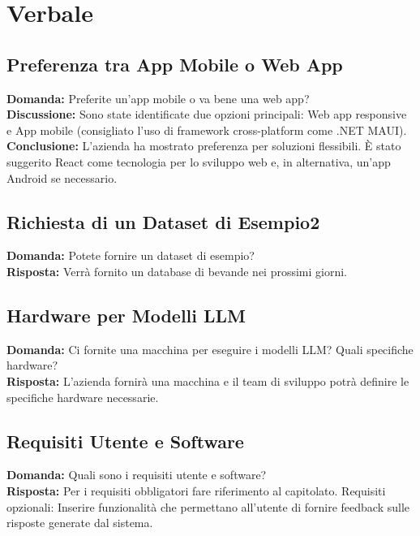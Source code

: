 \documentclass{article}
\begin{document}
\section{Verbale}

    \subsection{Preferenza tra App Mobile o Web App}
    \textbf{Domanda:} Preferite un'app mobile o va bene una web app? \\
    \textbf{Discussione:} Sono state identificate due opzioni principali: Web app responsive e App mobile (consigliato l'uso di framework cross-platform come .NET MAUI).\\
    \textbf{Conclusione:} L'azienda ha mostrato preferenza per soluzioni flessibili. È stato suggerito React come tecnologia per lo sviluppo web e, in alternativa, un’app Android se necessario.

    \subsection{Richiesta di un Dataset di Esempio2}
    \textbf{Domanda:} Potete fornire un dataset di esempio? \\
    \textbf{Risposta:} Verrà fornito un database di bevande nei prossimi giorni.

    \subsection{Hardware per Modelli LLM}
    \textbf{Domanda:} Ci fornite una macchina per eseguire i modelli LLM? Quali specifiche hardware? \\
    \textbf{Risposta:} L'azienda fornirà una macchina e il team di sviluppo potrà definire le specifiche hardware necessarie.

    \subsection{Requisiti Utente e Software}
    \textbf{Domanda:} Quali sono i requisiti utente e software? \\
    \textbf{Risposta:} Per i requisiti obbligatori fare riferimento al capitolato. Requisiti opzionali: Inserire funzionalità che permettano all'utente di fornire feedback sulle risposte generate dal sistema.
\end{document}
